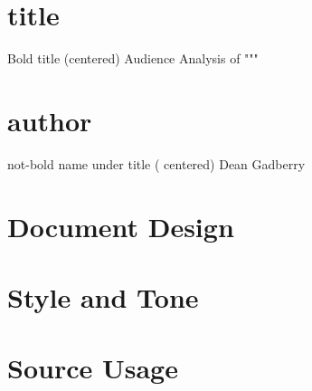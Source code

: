 \documentclass[12pt,a4paper,english]{article}
\begin{document}
\section{title}
Bold title (centered)
Audience Analysis of """
\endsection
\section{author}
not-bold name under title ( centered)
Dean Gadberry
\endsection

\section{Document Design}

\endsection
\section{Style and Tone}

\endsection
\section{Source Usage}

\endsection

\end{document}
